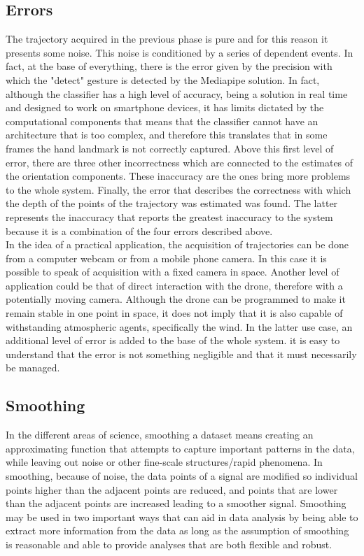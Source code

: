 \subsection{Errors}
\label{sec:errors}
\noindent The trajectory acquired in the previous phase is pure and for this reason it presents some noise. This noise is conditioned by a series of dependent events. In fact, at the base of everything, there is the error given by the precision with which the "detect" gesture is detected by the Mediapipe solution. In fact, although the classifier has a high level of accuracy, being a solution in real time and designed to work on smartphone devices, it has limits dictated by the computational components that means that the classifier cannot have an architecture that is too complex, and therefore this translates that in some frames the hand landmark is not correctly captured. Above this first level of error, there are three other incorrectness which are connected to the estimates of the orientation components. These inaccuracy are the ones bring more problems to the whole system. Finally, the error that describes the correctness with which the depth of the points of the trajectory was estimated was found. The latter represents the inaccuracy that reports the greatest inaccuracy to the system because it is a combination of the four errors described above. \\

\noindent In the idea of a practical application, the acquisition of trajectories can be done from a computer webcam or from a mobile phone camera. In this case it is possible to speak of acquisition with a fixed camera in space. Another level of application could be that of direct interaction with the drone, therefore with a potentially moving camera. Although the drone can be programmed to make it remain stable in one point in space, it does not imply that it is also capable of withstanding atmospheric agents, specifically the wind. In the latter use case, an additional level of error is added to the base of the whole system. it is easy to understand that the error is not something negligible and that it must necessarily be managed.

\subsection{Smoothing}
\label{sec:smoothing}

In the different areas of science, smoothing a dataset means creating an approximating function that attempts to capture important patterns in the data, while leaving out noise or other fine-scale structures/rapid phenomena. In smoothing, because of noise, the data points of a signal are modified so individual points higher than the adjacent points are reduced, and points that are lower than the adjacent points are increased leading to a smoother signal. Smoothing may be used in two important ways that can aid in data analysis by being able to extract more information from the data as long as the assumption of smoothing is reasonable and able to provide analyses that are both flexible and robust. \\

